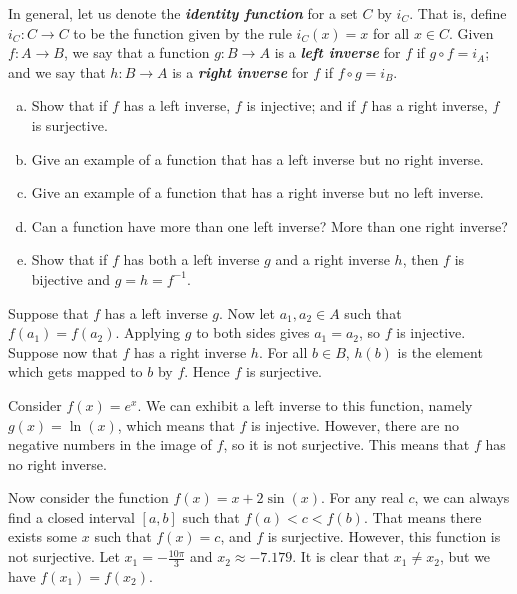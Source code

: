 \documentclass{zupan}
\begin{document}
\begin{problem}{5}
  In general, let us denote the \textbf{\textit{identity function}} for a set
  $C$ by $i_C$. That is, define $i_C : C \to C$ to be the function given by the
  rule $i_C(x) = x$ for all $x \in C$. Given $f : A \to B$, we say that a
  function $g : B \to A$ is a \textbf{\textit{left inverse}} for $f$ if $g
  \circ f = i_A$; and we say that $h : B \to A$ is a \textbf{\textit{right
  inverse}} for $f$ if $f \circ g = i_B$.

  \begin{enumerate}[(a), noitemsep]
    \item Show that if $f$ has a left inverse, $f$ is injective; and if $f$ has
      a right inverse, $f$ is surjective.
    \item Give an example of a function that has a left inverse but no right inverse.
    \item Give an example of a function that has a right inverse but no left inverse.
    \item Can a function have more than one left inverse? More than one right inverse?
    \item Show that if $f$ has both a left inverse $g$ and a right inverse $h$,
      then $f$ is bijective and $g = h = f^{-1}$.
  \end{enumerate}
\end{problem}

\begin{solution}
  \begin{multipart}
    \begin{qpart}
      Suppose that $f$ has a left inverse $g$. Now let $a_1, a_2 \in A$ such
      that $f(a_1) = f(a_2)$. Applying $g$ to both sides gives $a_1 = a_2$, so
      $f$ is injective. Suppose now that $f$ has a right inverse $h$. For all
      $b \in B$, $h(b)$ is the element which gets mapped to $b$ by $f$. Hence
      $f$ is surjective.
    \end{qpart}
    \begin{qpart}
      Consider $f(x) = e^x$. We can exhibit a left inverse to this function,
      namely $g(x) = \ln(x)$, which means that $f$ is injective. However, there
      are no negative numbers in the image of $f$, so it is not surjective.
      This means that $f$ has no right inverse.

      Now consider the function $f(x) = x + 2\sin(x)$. For any real $c$, we can
      always find a closed interval $[a, b]$ such that $f(a) < c < f(b)$. That
      means there exists some $x$ such that $f(x) = c$, and $f$ is surjective.
      However, this function is not surjective. Let $x_1 = -\frac{10\pi}{3}$
      and $x_2 \approx -7.179$. It is clear that $x_1 \neq x_2$, but we have
      $f(x_1) = f(x_2)$.
    \end{qpart}
  \end{multipart}
\end{solution}
\end{document}
